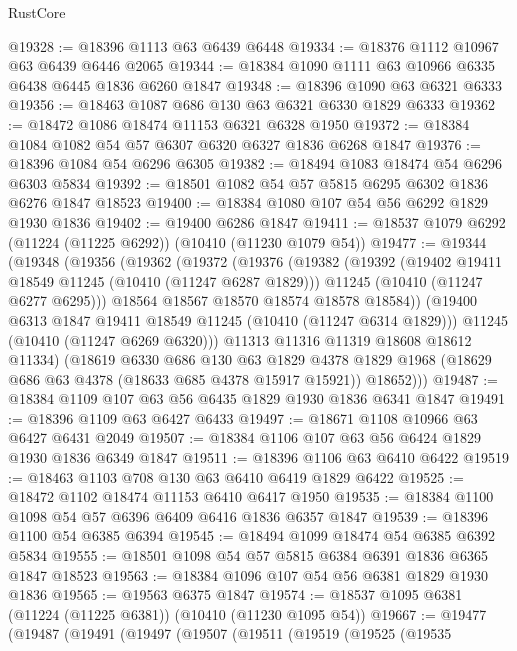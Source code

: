 \begin{lexlean}{RustCore}
\begin{coremodule}
@19328 := @18396 @1113 @63 @6439 @6448
@19334 := @18376 @1112 @10967 @63 @6439 @6446 @2065
@19344 := @18384 @1090 @1111 @63 @10966 @6335 @6438 @6445 @1836 @6260 @1847
@19348 := @18396 @1090 @63 @6321 @6333
@19356 := @18463 @1087 @686 @130 @63 @6321 @6330 @1829 @6333
@19362 := @18472 @1086 @18474 @11153 @6321 @6328 @1950
@19372 := @18384 @1084 @1082 @54 @57 @6307 @6320 @6327 @1836 @6268 @1847
@19376 := @18396 @1084 @54 @6296 @6305
@19382 := @18494 @1083 @18474 @54 @6296 @6303 @5834
@19392 := @18501 @1082 @54 @57 @5815 @6295 @6302 @1836 @6276 @1847 @18523
@19400 := @18384 @1080 @107 @54 @56 @6292 @1829 @1930 @1836
@19402 := @19400 @6286 @1847
@19411 := @18537 @1079 @6292 (@11224 (@11225 @6292)) (@10410 (@11230 @1079 @54))
@19477 := @19344
    (@19348
      (@19356
        (@19362
          (@19372
            (@19376
              (@19382
                (@19392
                  (@19402 @19411 @18549 @11245 (@10410 (@11247 @6287 @1829)))
                  @11245
                  (@10410 (@11247 @6277 @6295)))
                @18564
                @18567
                @18570
                @18574
                @18578
                @18584))
            (@19400 @6313 @1847 @19411 @18549 @11245 (@10410 (@11247 @6314 @1829)))
            @11245
            (@10410 (@11247 @6269 @6320)))
          @11313
          @11316
          @11319
          @18608
          @18612
          @11334)
        (@18619
          @6330
          @686
          @130
          @63
          @1829
          @4378
          @1829
          @1968
          (@18629 @686 @63 @4378 (@18633 @685 @4378 @15917 @15921))
          @18652)))
@19487 := @18384 @1109 @107 @63 @56 @6435 @1829 @1930 @1836 @6341 @1847
@19491 := @18396 @1109 @63 @6427 @6433
@19497 := @18671 @1108 @10966 @63 @6427 @6431 @2049
@19507 := @18384 @1106 @107 @63 @56 @6424 @1829 @1930 @1836 @6349 @1847
@19511 := @18396 @1106 @63 @6410 @6422
@19519 := @18463 @1103 @708 @130 @63 @6410 @6419 @1829 @6422
@19525 := @18472 @1102 @18474 @11153 @6410 @6417 @1950
@19535 := @18384 @1100 @1098 @54 @57 @6396 @6409 @6416 @1836 @6357 @1847
@19539 := @18396 @1100 @54 @6385 @6394
@19545 := @18494 @1099 @18474 @54 @6385 @6392 @5834
@19555 := @18501 @1098 @54 @57 @5815 @6384 @6391 @1836 @6365 @1847 @18523
@19563 := @18384 @1096 @107 @54 @56 @6381 @1829 @1930 @1836
@19565 := @19563 @6375 @1847
@19574 := @18537 @1095 @6381 (@11224 (@11225 @6381)) (@10410 (@11230 @1095 @54))
@19667 := @19477
    (@19487
      (@19491
        (@19497
          (@19507
            (@19511
              (@19519
                (@19525
                  (@19535

\end{coremodule}
\end{lexlean}
